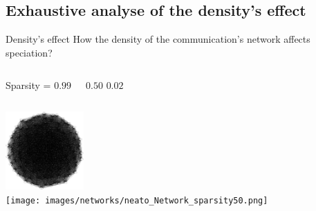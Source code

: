\documentclass[8pt, handout=show,notes=show]{beamer}
\begin{document}
\subsection{Exhaustive analyse of the density's effect}
\begin{frame}{Density's effect}
\renewcommand{\imgSize}{3cm}
How the density of the communication's network affects speciation?

\vfill
\begin{columns}
Sparsity = $0.99$

$0.50$
$0.02$
\end{columns}
\vfill
\begin{columns}
 
\includegraphics[width=\imgSize]{images/networks/neato_Network_sparsity1}\\
\texttt{[image: images/networks/neato\_Network\_sparsity50.png]}\\

\end{columns}
\end{frame}
\end{document}
